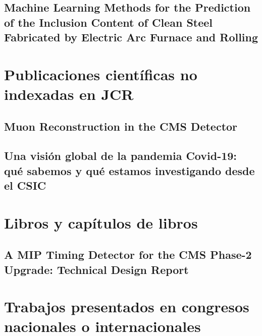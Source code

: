 \documentclass[a4paper, 11pt, twoside, openright]{report}
\begin{document}
\subsection{Machine Learning Methods for the Prediction of the Inclusion Content of Clean Steel Fabricated by Electric Arc Furnace and Rolling}



\section{Publicaciones científicas no indexadas en JCR}

\subsection{Muon Reconstruction in the CMS Detector}


\subsection{Una visión global de la pandemia Covid-19: qué sabemos y qué estamos investigando desde el CSIC}


\section{Libros y capítulos de libros}

\subsection{A MIP Timing Detector for the CMS Phase-2 Upgrade: Technical Design Report}



\section{Trabajos presentados en congresos nacionales o internacionales}
\end{document}
